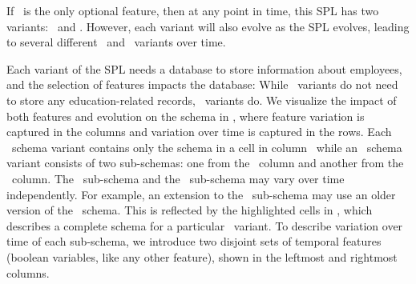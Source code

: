If \edu\ is the only optional feature, then at any point in time, this SPL has
two variants: \basic\ and \educational. However, each variant will also evolve
as the SPL evolves, leading to several different \basic\ and \educational\
variants over time.


Each variant of the SPL needs a database to store information
about employees, and the selection of features impacts the database: While
\basic\ variants do not need to store any education-related records,
\educational\ variants do. 
We visualize the impact of both features and evolution on the schema in
\tabref{mot}, where feature variation is captured in the columns and variation
over time is captured in the rows.
%
%
Each \basic\ schema variant contains only the schema in a cell in column \basic\
while an \educational\ schema variant consists of two sub-schemas: one from the \basic\
column and another from the \educational\ column.
%
The \basic\ sub-schema and the \educational\ sub-schema may vary over time
independently. For example, an extension to the \educational\ sub-schema may
use an older version of the \basic\ schema. This is reflected by the
highlighted cells in \tabref{mot}, which describes a complete schema for a
particular \educational\ variant.
%
To describe variation over time of each sub-schema, we introduce two disjoint
sets of temporal features (boolean variables, like any other feature), shown in
the leftmost and rightmost columns.



